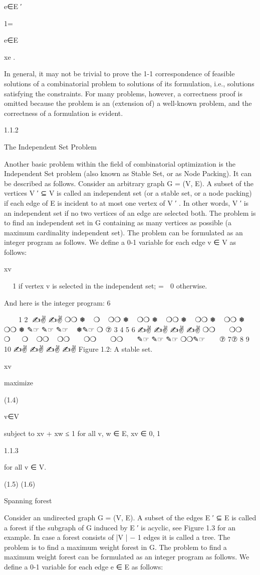 \documentclass[titlepage]{book}
\begin{document}
e∈E ′

1=

e∈E

xe .

In general, it may not be trivial to prove the 1-1 correspondence of feasible solutions of a combinatorial
problem to solutions of its formulation, i.e., solutions satisfying the constraints. For many problems,
however, a correctness proof is omitted because the problem is an (extension of) a well-known problem,
and the correctness of a formulation is evident.

1.1.2

The Independent Set Problem

Another basic problem within the field of combinatorial optimization is the Independent Set problem
(also known as Stable Set, or as Node Packing). It can be described as follows.
Consider an arbitrary graph G = (V, E). A subset of the vertices V ′ ⊆ V is called an independent set
(or a stable set, or a node packing) if each edge of E is incident to at most one vertex of V ′ . In other
words, V ′ is an independent set if no two vertices of an edge are selected both. The problem is to find an
independent set in G containing as many vertices as possible (a maximum cardinality independent set).
The problem can be formulated as an integer program as follows. We define a 0-1 variable for each edge
v ∈ V as follows:

xv


 1 if vertex v is selected in the independent set;
=
 0 otherwise.

And here is the integer program:
6

✎☞
✎☞
1
2⑦
✍✌
✍✌
❍❍
❅
 
❍
 
❍❍
❅
 
❍❍
❅
 
❍❍
❅
 
❍❍ ❅
 
❍❍ ❅
 
❍❍
❅
✎☞
✎☞
✎☞
 
❅✎☞
❍
⑦
3
4
5
6
✍✌
✍✌
✍✌
✍✌
❍❍
 
 
❍❍
 
 
❍ 
 
❍
  ❍❍
 
❍❍
 
 
❍❍
 
 
❍❍
 
 
✎☞
✎☞
✎☞
❍❍✎☞
 
 
⑦
7⑦
8
9
10
✍✌
✍✌
✍✌
✍✌
Figure 1.2: A stable set.

xv

maximize

(1.4)

v∈V

subject to xv + xw ≤ 1 for all {v, w} ∈ E,
xv ∈ {0, 1}

1.1.3

for all v ∈ V.

(1.5)
(1.6)

Spanning forest

Consider an undirected graph G = (V, E). A subset of the edges E ′ ⊆ E is called a forest if the subgraph
of G induced by E ′ is acyclic, see Figure 1.3 for an example. In case a forest consists of |V | − 1 edges it
is called a tree. The problem is to find a maximum weight forest in G.
The problem to find a maximum weight forest can be formulated as an integer program as follows. We
define a 0-1 variable for each edge e ∈ E as follows:
\end{document}
